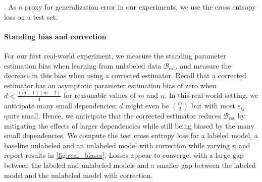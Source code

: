 . As a proxy for generalization error in our experiments, we use the cross entropy loss on a test set.

\paragraph{Standing bias and correction}

For our first real-world experiment, we measure the standing parameter estimation bias when learning from unlabeled data $\mathcal{B}_\text{est}$, and measure the decrease in this bias when using a corrected estimator. Recall that a corrected estimator has an asymptotic parameter estimation bias of zero when $d<\frac{(m-1)(m-2)}{4}$ for reasonable values of $m$ and $n$. In this real-world setting, we anticipate many small dependencies; $d$ might even be $m \choose 2$ but with most $\varepsilon_{ij}$ quite small. Hence, we anticipate that the corrected estimator reduces $\mathcal{B}_\text{est}$ by mitigating the effects of larger dependencies while still being biased by the many small dependencies. We compute the test cross entropy loss for a labeled model, a baseline unlabeled and an unlabeled model with correction while varying $n$ and report results in \autoref{fig:real_biases}. Losses appear to converge, with a large gap between the labeled and unlabeled models and a smaller gap between the labeled model and the unlabeled model with correction.

